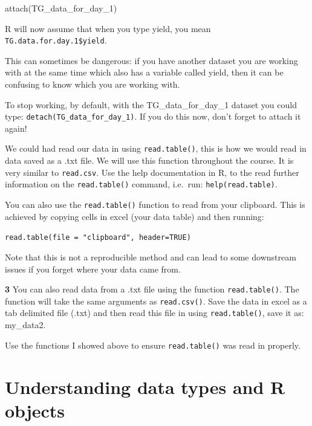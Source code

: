 \documentclass[
]{book}
\makeatletter
\newenvironment{Shaded}{\begin{snugshade}}{\end{snugshade}}
\newcommand{\FunctionTok}[1]{\textcolor[rgb]{0.00,0.00,0.00}{#1}}
\newcommand{\NormalTok}[1]{#1}
\newenvironment{kframe}{%
\medskip{}
\setlength{\fboxsep}{.8em}
 \def\at@end@of@kframe{}%
 \ifinner\ifhmode%
  \def\at@end@of@kframe{\end{minipage}}%
  \begin{minipage}{\columnwidth}%
 \fi\fi%
 \def\FrameCommand##1{\hskip\@totalleftmargin \hskip-\fboxsep
 \colorbox{shadecolor}{##1}\hskip-\fboxsep
     \hskip-\linewidth \hskip-\@totalleftmargin \hskip\columnwidth}%
 \MakeFramed {\advance\hsize-\width
   \@totalleftmargin\z@ \linewidth\hsize
   \@setminipage}}%
 {\par\unskip\endMakeFramed%
 \at@end@of@kframe}
\newenvironment{rmdblock}[1]
  {
  \begin{itemize}
  \renewcommand{\labelitemi}{
    \raisebox{-.7\height}[0pt][0pt]{
      {\setkeys{Gin}{width=3em,keepaspectratio}\texttt{[image: images/\#1]}}
    }
  }
  \setlength{\fboxsep}{1em}
  \begin{kframe}
  \item
  }
  {
  \end{kframe}
  \end{itemize}
  }
\newenvironment{rmdquiz}
  {\begin{rmdblock}{quiz}}
  {\end{rmdblock}}
\newenvironment{rmdwarning}
  {\begin{rmdblock}{warning}}
  {\end{rmdblock}}
\makeatother
\begin{document}
\begin{Shaded}
\begin{Highlighting}[]
\FunctionTok{attach}\NormalTok{(TG\_data\_for\_day\_1)}
\end{Highlighting}
\end{Shaded}

R will now assume that when you type yield, you mean \texttt{TG.data.for.day.1\$yield}.

\begin{rmdwarning}
This can sometimes be dangerous: if you have another dataset you are working with at the same time which also has a variable called yield, then it can be confusing to know which you are working with.
\end{rmdwarning}

To stop working, by default, with the TG\_data\_for\_day\_1 dataset you could type: \texttt{detach(TG\_data\_for\_day\_1)}. If you do this now, don't forget to attach it again!

We could had read our data in using \texttt{read.table()}, this is how we would read in data saved as a .txt file. We will use this function throughout the course. It is very similar to \texttt{read.csv}. Use the help documentation in R, to the read further information on the \texttt{read.table()} command, i.e.~run: \texttt{help(read.table)}.

You can also use the \texttt{read.table()} function to read from your clipboard. This is achieved by copying cells in excel (your data table) and then running:

\texttt{read.table(file\ =\ "clipboard",\ header=TRUE)}

Note that this is not a reproducible method and can lead to some downstream issues if you forget where your data came from.

\begin{rmdquiz}
\textbf{3} You can also read data from a .txt file using the function \texttt{read.table()}. The function will take the same arguments as \texttt{read.csv()}. Save the data in excel as a tab delimited file (.txt) and then read this file in using \texttt{read.table()}, save it as: my\_data2.

Use the functions I showed above to ensure \texttt{read.table()} was read in properly.
\end{rmdquiz}

\hypertarget{understanding-data-types-and-r-objects}{%
\section{Understanding data types and R objects}\label{understanding-data-types-and-r-objects}}
\end{document}
